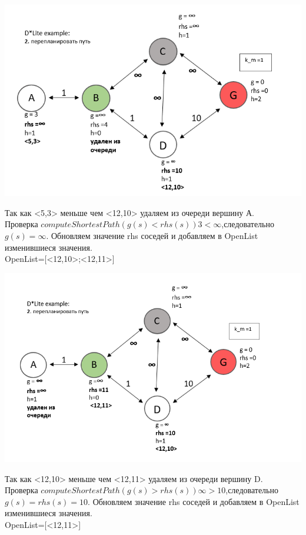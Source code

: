\documentclass[12pt]{article}
\begin{document}
\begin{center}
         \includegraphics[width=1\textwidth]{img/example5_1.png}
    \end{center}
Так как <5,3> меньше чем <12,10> удаляем из очереди вершину А.\\Проверка 
$computeShortestPath(g(s)<rhs(s)) 3 < \infty $,следовательно $g(s)=\infty$. Обновляем значение rhs соседей и добавляем в OpenList изменившиеся значения.\\OpenList=[<12,10>;<12,11>]
\begin{center}
         \includegraphics[width=1\textwidth]{img/example5_2.png}
    \end{center}
Так как <12,10> меньше чем <12,11> удаляем из очереди вершину D.\\Проверка 
$computeShortestPath(g(s)>rhs(s)) \infty >10 $,следовательно $g(s)=rhs(s)=10$. Обновляем значение rhs соседей и добавляем в OpenList изменившиеся значения.\\OpenList=[<12,11>]
\end{document}

